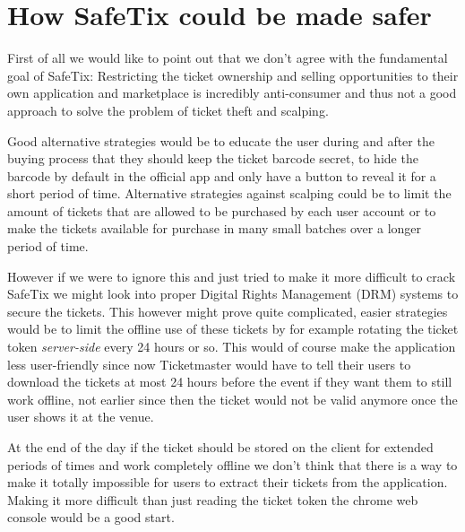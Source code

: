 \section{How SafeTix could be made safer}
First of all we would like to point out that we don't agree with the fundamental goal of SafeTix: Restricting the ticket ownership and selling opportunities to their own application and marketplace is incredibly anti-consumer and thus not a good approach to solve the problem of ticket theft and scalping.

Good alternative strategies would be to educate the user during and after the buying process that they should keep the ticket barcode secret, to hide the barcode by default in the official app and only have a button to reveal it for a short period of time. Alternative strategies against scalping could be to limit the amount of tickets that are allowed to be purchased by each user account or to make the tickets available for purchase in many small batches over a longer period of time.

However if we were to ignore this and just tried to make it more difficult to crack SafeTix we might look into proper Digital Rights Management (DRM) systems to secure the tickets. This however might prove quite complicated, easier strategies would be to limit the offline use of these tickets by for example rotating the ticket token \textit{server-side} every 24 hours or so. This would of course make the application less user-friendly since now Ticketmaster would have to tell their users to download the tickets at most 24 hours before the event if they want them to still work offline, not earlier since then the ticket would not be valid anymore once the user shows it at the venue.

At the end of the day if the ticket should be stored on the client for extended periods of times and work completely offline we don't think that there is a way to make it totally impossible for users to extract their tickets from the application. Making it more difficult than just reading the ticket token the chrome web console would be a good start.
